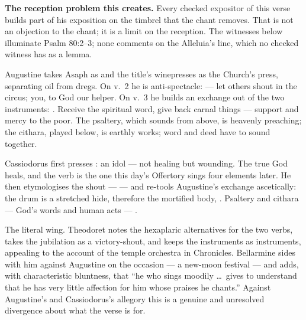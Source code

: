 \textbf{The reception problem this creates.} Every checked
expositor of this verse builds part of his exposition on the timbrel that the
chant removes. That is not an objection to the chant; it is a limit on the
reception. The witnesses below illuminate Psalm 80:2--3; none comments on the
Alleluia's line, which no checked witness has as a lemma.

\begin{witnessnote}
Augustine takes Asaph as  and the title's winepresses as the
Church's press, separating oil from dregs. On v.~2 he is anti-spectacle:
 --- let others shout in the circus; you,
to God our helper. On v.~3 he builds an exchange out of the two instruments:
. Receive the spiritual word, give back carnal things --- support
and mercy to the poor. The psaltery, which sounds from above, is heavenly
preaching; the cithara, played below, is earthly works; word and deed have to
sound together.
\end{witnessnote}

\begin{witnessnote}
Cassiodorus first presses : an idol  --- not healing but
wounding. The true God heals, and the verb is the one this day's Offertory
sings four elements later. He then etymologises the shout ---  --- and re-tools Augustine's exchange
ascetically: the drum is a stretched hide, therefore the mortified body,
. Psaltery and cithara --- God's words
and human acts --- .
\end{witnessnote}

\begin{witnessnote}
The literal wing. Theodoret notes the hexaplaric alternatives for the two
verbs, takes the jubilation as a victory-shout, and keeps the instruments as
instruments, appealing to the account of the temple orchestra in Chronicles.
Bellarmine sides with him against Augustine on the occasion --- a new-moon
festival --- and adds, with characteristic bluntness, that ``he who sings
moodily \dots\ gives to understand that he has very little affection for him
whose praises he chants.'' Against Augustine's and Cassiodorus's allegory this
is a genuine and unresolved divergence about what the verse is for.
\end{witnessnote}

